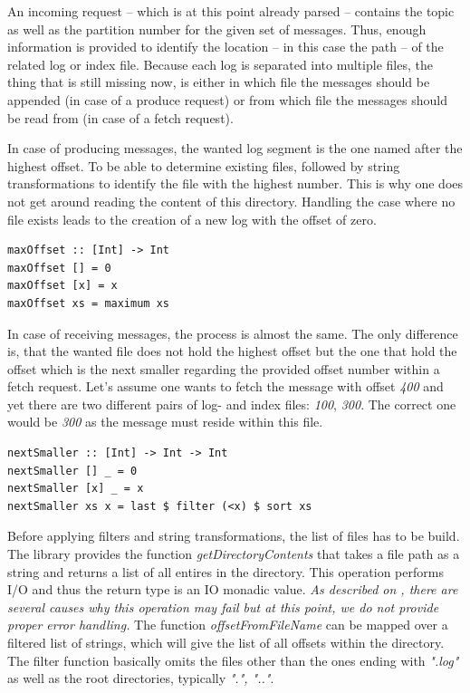 An incoming request -- which is at this point already parsed -- contains the
topic as well as the partition number for the given set of messages. Thus,
enough information is provided to identify the location -- in this case the path
-- of the related log or index file. Because each log is separated into multiple
files, the thing that is still missing now, is either in
which file the messages should be appended (in case of a produce request) or
from which file the messages should be read from (in case of a fetch request).

In case of producing messages, the wanted log segment is the one named after the
highest offset. To be able to determine existing files, followed by string
transformations to identify the file with the highest number. This is why one
does not get around reading the content of this directory. Handling the case
where no file exists leads to the creation of a new log with the offset of zero.

\begin{lstlisting}[caption={Determining highest offset of given list}]
maxOffset :: [Int] -> Int
maxOffset [] = 0
maxOffset [x] = x
maxOffset xs = maximum xs
\end{lstlisting}

In case of receiving messages, the process is almost the same. The only
difference is, that the wanted file does not hold the highest offset but the one
that hold the offset which is the next smaller regarding the provided offset
number within a fetch request. Let's assume one wants to fetch the message with
offset \textit{400} and yet there are two different pairs of log- and index
files: \textit{100}, \textit{300}. The correct one would be \textit{300} as the
message must reside within this file.

\begin{lstlisting}[caption={Determining offset which is next smaller regarding given offset}]
%todo: code for next smaller
nextSmaller :: [Int] -> Int -> Int
nextSmaller [] _ = 0
nextSmaller [x] _ = x
nextSmaller xs x = last $ filter (<x) $ sort xs
\end{lstlisting}

Before applying filters and string transformations, the list of files has to be
build. The library
provides the function \textit{getDirectoryContents} that takes a file path as a
string and returns a list of all entires in the directory. This operation
performs I/O and thus the return type is an IO monadic value. \textit{As
described on
,
there are several causes why this operation may fail but at this point, we do
not provide proper error handling.}
The function \textit{offsetFromFileName} can be mapped over a filtered list of
strings, which will give the list of all offsets within the directory. The
filter function basically omits the files other than the ones ending with
\textit{".log"} as well as the root directories, typically \textit{".", ".."}.

